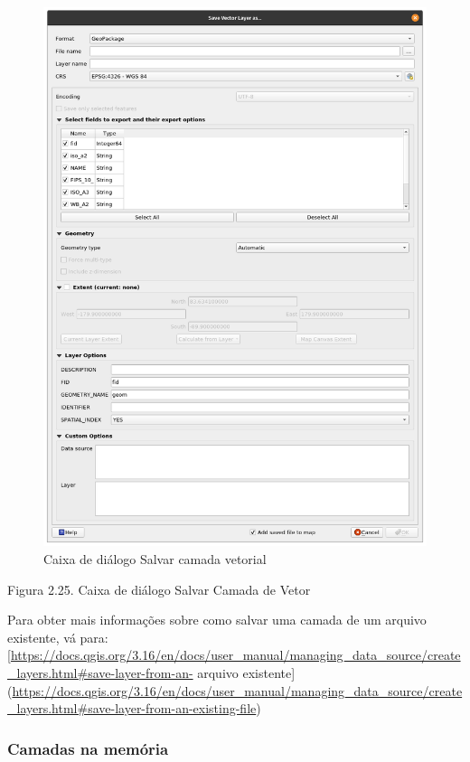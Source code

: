 \documentclass[
]{book}
\begin{document}
\begin{figure}
\centering
\includegraphics{media/modulo2/save-vector.png}
\caption{Caixa de diálogo Salvar camada vetorial}
\end{figure}

Figura 2.25. Caixa de diálogo Salvar Camada de Vetor

Para obter mais informações sobre como salvar uma camada de um arquivo existente, vá para: {[}\url{https://docs.qgis.org/3.16/en/docs/user_manual/managing_data_source/create_layers.html\#save-layer-from-an-} arquivo existente{]} (\url{https://docs.qgis.org/3.16/en/docs/user_manual/managing_data_source/create_layers.html\#save-layer-from-an-existing-file})

\hypertarget{camadas-na-memuxf3ria}{%
\subsubsection{\texorpdfstring{\textbf{Camadas na memória}}{Camadas na memória}}\label{camadas-na-memuxf3ria}}
\end{document}
